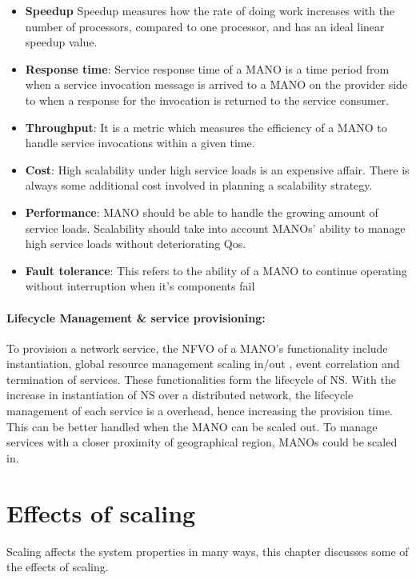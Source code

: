 \begin{itemize}
	\item \textbf{Speedup} Speedup measures how the  rate of doing work increases with the number of processors, compared to one processor, and has an ideal linear speedup value. \cite{jogalekar_evaluating_2000}
	\item  \textbf{Response time}: Service response time of a MANO is a time period from when a service invocation message is arrived to a MANO on the provider side to when a response for the invocation is returned to the service consumer.
	\item \textbf {Throughput}: It is a metric which measures the efficiency of a MANO to handle service invocations within a given time.
	\item \textbf{Cost}: High scalability under high service loads is an expensive affair. There is always some additional cost involved in planning a scalability strategy.
	\item \textbf{Performance}: MANO should be able to handle the growing amount of service loads. Scalability should take into account MANOs' ability to manage high service loads without deteriorating Qos.
	\item \textbf{Fault tolerance}: This refers to the ability of a MANO to continue operating without interruption when it's components fail
\end{itemize}


\paragraph{Lifecycle Management \& service provisioning:} To provision a network service, the NFVO of a MANO's functionality include instantiation, global resource management scaling in/out , event correlation and termination of services. These functionalities form the lifecycle of NS. With the increase in instantiation of NS over a distributed network, the lifecycle management of each service is a overhead, hence increasing the provision time. This can be better handled when the MANO can be scaled out. To manage services with a closer proximity of geographical region, MANOs could be scaled in.

\section{Effects of scaling}

Scaling affects the system properties in many ways, this chapter discusses some of the effects of scaling.

